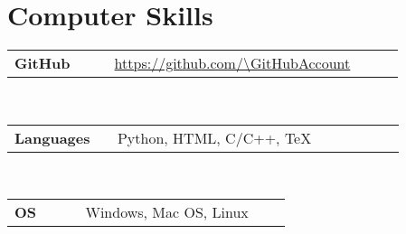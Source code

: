 \newcommand{\skill}[2]
  {\small \color{maincolor}
    \begin{tabular}{@{} p{0.22\linewidth} p{0.64\linewidth}}
      \textbf{\color{hlcolor-0} #1} & \textcolor{maincolor}{#2}
    \end{tabular}}
  
\newcommand{\github}
  {\small \url{https://github.com/\GitHubAccount}}


\section*{Computer Skills}
\begin{cvcontent}
  \skill{GitHub}{\github}\\ [0.5mm]
  \skill{Languages}{Python, HTML, C/C++, TeX}\\ [0.5mm]
  \skill{OS}{Windows, Mac OS, Linux}
\end{cvcontent}
